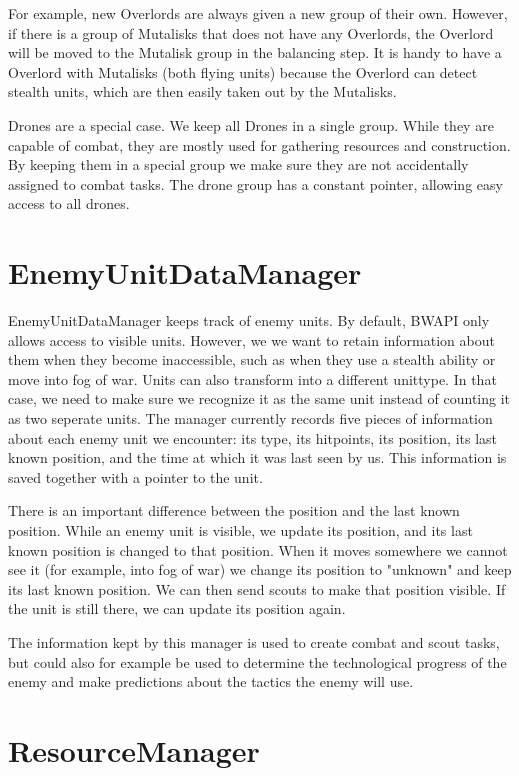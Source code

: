 For example, new Overlords are always given a new group of their own. However, if there is a group of Mutalisks that does not have any Overlords, the Overlord will be moved to the Mutalisk group in the balancing step. It is handy to have a Overlord with Mutalisks (both flying units) because the Overlord can detect stealth units, which are then easily taken out by the Mutalisks.

Drones are a special case. We keep all Drones in a single group. While they are capable of combat, they are mostly used for gathering resources and construction. By keeping them in a special group we make sure they are not accidentally assigned to combat tasks. The drone group has a constant pointer, allowing easy access to all drones.

\section{EnemyUnitDataManager}

EnemyUnitDataManager keeps track of enemy units. By default, BWAPI only allows access to visible units. However, we we want to retain information about them when they become inaccessible, such as when they use a stealth ability or move into fog of war. Units can also transform into a different unittype. In that case, we need to make sure we recognize it as the same unit instead of counting it as two seperate units. The manager currently records five pieces of information about each enemy unit we encounter: its type, its hitpoints, its position, its last known position, and the time at which it was last seen by us. This information is saved together with a pointer to the unit.

There is an important difference between the position and the last known position. While an enemy unit is visible, we update its position, and its last known position is changed to that position. When it moves somewhere we cannot see it (for example, into fog of war) we change its position to "unknown" and keep its last known position. We can then send scouts to make that position visible. If the unit is still there, we can update its position again.

The information kept by this manager is used to create combat and scout tasks, but could also for example be used to determine the technological progress of the enemy and make predictions about the tactics the enemy will use.

\section{ResourceManager}

